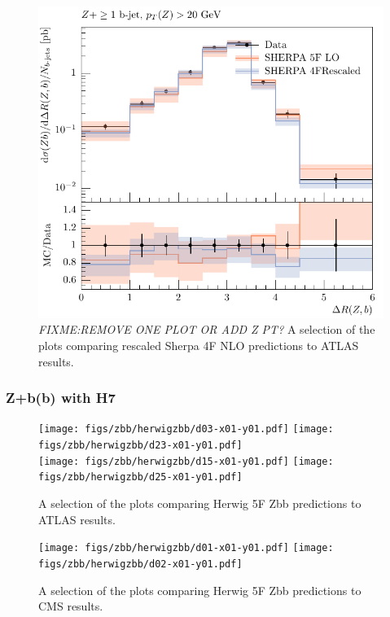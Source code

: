 \documentclass[11pt]{cernrep}
\newcommand{\Herwig}{H\protect\scalebox{0.8}{ERWIG}7\xspace}
\begin{document}
\begin{figure}[htbp]
\begin{center}
   \includegraphics[scale=0.65]{figs/zbb/sherpa/d13-x01-y01_rescaled.pdf} 
\caption{{\em FIXME:REMOVE ONE PLOT OR ADD Z PT?} A selection of the plots
  comparing rescaled Sherpa 4F NLO predictions to ATLAS results.}
\label{zbb-sherpa-scaled}
\end{center}
\end{figure}

\subsubsection{Z+b(b) with \Herwig}
\label{sec:ZHerwig}

\begin{figure}[htbp]
\begin{center}
   \texttt{[image: figs/zbb/herwigzbb/d03-x01-y01.pdf]} 
   \texttt{[image: figs/zbb/herwigzbb/d23-x01-y01.pdf]} \\
   \texttt{[image: figs/zbb/herwigzbb/d15-x01-y01.pdf]} 
   \texttt{[image: figs/zbb/herwigzbb/d25-x01-y01.pdf]} 
\caption{A selection of the plots comparing Herwig 5F Zbb predictions to ATLAS results.}
\label{zbb-herwigzbb-atlas}
\end{center}
\end{figure}
\begin{figure}[htbp]
   \texttt{[image: figs/zbb/herwigzbb/d01-x01-y01.pdf]} 
   \texttt{[image: figs/zbb/herwigzbb/d02-x01-y01.pdf]} 
\caption{A selection of the plots comparing Herwig 5F Zbb predictions to CMS results.}
\label{zbb-herwigzbb-cms}
\end{figure}
\end{document}

